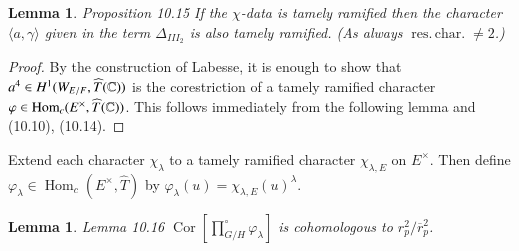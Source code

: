 \documentclass[11pt]{amsart}
\theoremstyle{plain}
\newtheorem{lemma}[theorem]{Lemma}
\theoremstyle{definition}
\def\Com{{\Bbb C}}                         %
\def\Hom{\operatorname{Hom}}         %
\def\reschar{\operatorname{res.\,char.}}
\begin{document}
\begin{lemma}{Proposition 10.15}  If the $\chi$-data is 
tamely ramified then the character
$\langle a,\gamma\rangle$ given in the term 
$\Delta_{III_2}$ is also  tamely ramified.
(As always $\reschar \ne 2$.)
\end{lemma}

\begin{proof}  By the construction of Labesse, it is 
enough to show that $a^4\in H^1(W_{E/F},\widehat T(\Com))$
is the corestriction of a  tamely ramified character
$\varphi\in\Hom_c(E^\times,\widehat T(\Com))$.  This follows
immediately from the following lemma and (10.10), (10.14).
\end{proof}

Extend each character $\chi_\lambda$ to a tamely ramified character $\chi_{\lambda,E}$
on $E^\times$.  Then
define 
$\varphi_\lambda\in \Hom_c(E^\times,\widehat T)$ by
$\varphi_\lambda(u) = \chi_{\lambda,E}(u)^\lambda$.

\begin{lemma}{Lemma 10.16}  
$\operatorname{Cor}\left[\prod_{G/H}^\circ\varphi_\lambda\right]$
is cohomologous to $r_p^2/\overline r_p^2$.
\end{lemma}
\end{document}
